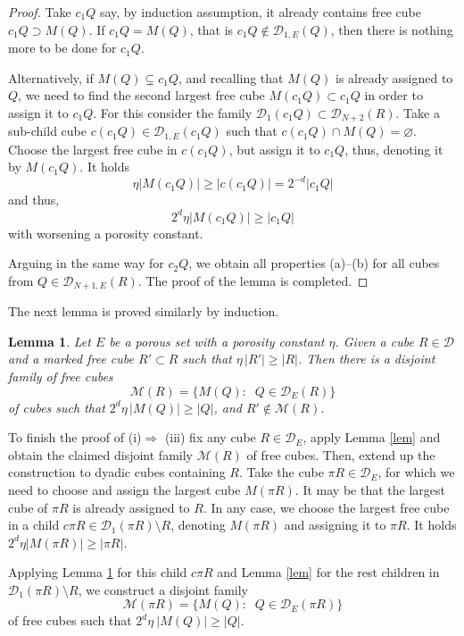 \documentclass[12pt]{amsart} \setlength{\textwidth}{15cm} \setlength{\textheight}{24cm} \setlength{\voffset}{-1cm} \setlength{\oddsidemargin}{-0.4cm} \setlength{\evensidemargin}{-0.4cm}
\newtheorem {lemma}  [theorem]{Lemma}
\theoremstyle{definition}
\theoremstyle{remark}
\begin{document}
\begin{proof}
 Take $c_1Q$ say,  by induction assumption, it already contains free cube
    $c_1Q \supset  M(Q)$.   If    $c_1Q=M(Q)$, that is $c_1Q \notin \mathcal{D}_{1,E} (Q)$, then there is nothing more to be done for $c_1Q$.

  Alternatively,
  if $M(Q) \varsubsetneq c_1Q$,  and recalling that  $M(Q)$ is already assigned to $Q$, we need to find the second  largest free cube $M(c_1Q) \subset c_1Q$  in order to assign it to $c_1Q$.
                     For this  consider  the family $\mathcal{D}_1(c_1Q) \subset \mathcal{D}_{N+2}(R)$. Take a sub-child cube  $ c(c_1Q) \in  \mathcal{D}_{1,E}(c_1Q)$ such that   $c(c_1Q) \cap M(Q) = \varnothing$.
  Choose the largest free cube in  $c(c_1Q)$, but assign it to $c_1Q$,  thus,  denoting it  by $M(c_1Q)$. It holds
     \[\eta |M(c_1Q)| \geq |c(c_1Q)|= 2^{-d}  |c_1Q|\]
    and thus,
     \[2^d \eta |M(c_1Q)| \geq    |c_1Q|\]
     with
 worsening a porosity constant.





     Arguing in the same way for $c_2Q$, we obtain
   all properties (a)--(b) for all cubes from $Q \in \mathcal{D}_{N+1,E}(R)$.
The proof of the lemma is completed.
   \end{proof}
 The next lemma is proved similarly by induction.
\begin{lemma}\label{lem1}
 Let  $E$ be a porous set with a porosity constant $\eta$. Given  a cube $R\in \mathcal{D}$ and a marked free cube
   $R'\subset R$ such that $\eta\,| R'| \geq  | R|$. Then there is a  disjoint family of free cubes
   \[\mathcal{M}(R) = \{M(Q):\;\; Q \in \mathcal{D}_{E}(R) \}\]
   of cubes such that  $2^d \eta \,| M(Q)| \geq |Q|$, and $R' \notin \mathcal{M}(R) $.
\end{lemma}

 To finish the proof of (i)$\Rightarrow$ (iii)
fix any cube $R \in \mathcal{D}_E$, apply
 Lemma \ref{lem} and obtain the claimed  disjoint family
   $\mathcal{M}(R)$ of free cubes.
Then,   extend up the construction to dyadic cubes containing $R$. Take the cube $\pi R \in \mathcal{D}_E$, for which  we need to choose and assign the largest cube $M(\pi R)$. It may be that  the largest cube of $\pi R$  is already assigned to $R$. In any case,  we choose the largest free cube in  a child  $ c\pi R \in \mathcal{D}_1(\pi  R) \setminus R$, denoting  $M(\pi R)$ and   assigning it to  $\pi R$.
It holds $2^d \eta | M(\pi R)| \geq |\pi R|$.

     Applying Lemma \ref{lem1} for this child $c\pi R$ and Lemma \ref{lem}  for the rest   children  in  $\mathcal{D}_1(\pi  R) \setminus R$, we  construct a  disjoint family
   \[\mathcal{M}(\pi R) = \{M(Q):\;\; Q \in \mathcal{D}_{E}(\pi R) \}\]
   of free cubes such that $2^d \eta\: | M(Q)| \geq |Q|$.
\end{document}
